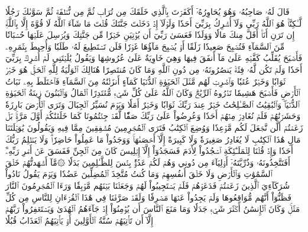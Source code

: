 قَالَ لَهُۥ صَاحِبُهُۥ وَهُوَ يُحَاوِرُهُۥٓ أَكَفَرۡتَ بِٱلَّذِي خَلَقَكَ مِن تُرَابٖ ثُمَّ مِن نُّطۡفَةٖ ثُمَّ سَوَّىٰكَ رَجُلٗا
لَّـٰكِنَّا۠ هُوَ ٱللَّهُ رَبِّي وَلَآ أُشۡرِكُ بِرَبِّيٓ أَحَدٗا
وَلَوۡلَآ إِذۡ دَخَلۡتَ جَنَّتَكَ قُلۡتَ مَا شَآءَ ٱللَّهُ لَا قُوَّةَ إِلَّا بِٱللَّهِۚ إِن تَرَنِ أَنَا۠ أَقَلَّ مِنكَ مَالٗا وَوَلَدٗا
فَعَسَىٰ رَبِّيٓ أَن يُؤۡتِيَنِ خَيۡرٗا مِّن جَنَّتِكَ وَيُرۡسِلَ عَلَيۡهَا حُسۡبَانٗا مِّنَ ٱلسَّمَآءِ فَتُصۡبِحَ صَعِيدٗا زَلَقًا
أَوۡ يُصۡبِحَ مَآؤُهَا غَوۡرٗا فَلَن تَسۡتَطِيعَ لَهُۥ طَلَبٗا
وَأُحِيطَ بِثَمَرِهِۦ فَأَصۡبَحَ يُقَلِّبُ كَفَّيۡهِ عَلَىٰ مَآ أَنفَقَ فِيهَا وَهِيَ خَاوِيَةٌ عَلَىٰ عُرُوشِهَا وَيَقُولُ يَٰلَيۡتَنِي لَمۡ أُشۡرِكۡ بِرَبِّيٓ أَحَدٗا
وَلَمۡ تَكُن لَّهُۥ فِئَةٞ يَنصُرُونَهُۥ مِن دُونِ ٱللَّهِ وَمَا كَانَ مُنتَصِرًا
هُنَالِكَ ٱلۡوَلَٰيَةُ لِلَّهِ ٱلۡحَقِّۚ هُوَ خَيۡرٞ ثَوَابٗا وَخَيۡرٌ عُقۡبٗا
وَٱضۡرِبۡ لَهُم مَّثَلَ ٱلۡحَيَوٰةِ ٱلدُّنۡيَا كَمَآءٍ أَنزَلۡنَٰهُ مِنَ ٱلسَّمَآءِ فَٱخۡتَلَطَ بِهِۦ نَبَاتُ ٱلۡأَرۡضِ فَأَصۡبَحَ هَشِيمٗا تَذۡرُوهُ ٱلرِّيَٰحُۗ وَكَانَ ٱللَّهُ عَلَىٰ كُلِّ شَيۡءٖ مُّقۡتَدِرًا
ٱلۡمَالُ وَٱلۡبَنُونَ زِينَةُ ٱلۡحَيَوٰةِ ٱلدُّنۡيَاۖ وَٱلۡبَٰقِيَٰتُ ٱلصَّـٰلِحَٰتُ خَيۡرٌ عِندَ رَبِّكَ ثَوَابٗا وَخَيۡرٌ أَمَلٗا
وَيَوۡمَ نُسَيِّرُ ٱلۡجِبَالَ وَتَرَى ٱلۡأَرۡضَ بَارِزَةٗ وَحَشَرۡنَٰهُمۡ فَلَمۡ نُغَادِرۡ مِنۡهُمۡ أَحَدٗا
وَعُرِضُواْ عَلَىٰ رَبِّكَ صَفّٗا لَّقَدۡ جِئۡتُمُونَا كَمَا خَلَقۡنَٰكُمۡ أَوَّلَ مَرَّةِۭۚ بَلۡ زَعَمۡتُمۡ أَلَّن نَّجۡعَلَ لَكُم مَّوۡعِدٗا
وَوُضِعَ ٱلۡكِتَٰبُ فَتَرَى ٱلۡمُجۡرِمِينَ مُشۡفِقِينَ مِمَّا فِيهِ وَيَقُولُونَ يَٰوَيۡلَتَنَا مَالِ هَٰذَا ٱلۡكِتَٰبِ لَا يُغَادِرُ صَغِيرَةٗ وَلَا كَبِيرَةً إِلَّآ أَحۡصَىٰهَاۚ وَوَجَدُواْ مَا عَمِلُواْ حَاضِرٗاۗ وَلَا يَظۡلِمُ رَبُّكَ أَحَدٗا
وَإِذۡ قُلۡنَا لِلۡمَلَـٰٓئِكَةِ ٱسۡجُدُواْ لِأٓدَمَ فَسَجَدُوٓاْ إِلَّآ إِبۡلِيسَ كَانَ مِنَ ٱلۡجِنِّ فَفَسَقَ عَنۡ أَمۡرِ رَبِّهِۦٓۗ أَفَتَتَّخِذُونَهُۥ وَذُرِّيَّتَهُۥٓ أَوۡلِيَآءَ مِن دُونِي وَهُمۡ لَكُمۡ عَدُوُّۢۚ بِئۡسَ لِلظَّـٰلِمِينَ بَدَلٗا
۞مَّآ أَشۡهَدتُّهُمۡ خَلۡقَ ٱلسَّمَٰوَٰتِ وَٱلۡأَرۡضِ وَلَا خَلۡقَ أَنفُسِهِمۡ وَمَا كُنتُ مُتَّخِذَ ٱلۡمُضِلِّينَ عَضُدٗا
وَيَوۡمَ يَقُولُ نَادُواْ شُرَكَآءِيَ ٱلَّذِينَ زَعَمۡتُمۡ فَدَعَوۡهُمۡ فَلَمۡ يَسۡتَجِيبُواْ لَهُمۡ وَجَعَلۡنَا بَيۡنَهُم مَّوۡبِقٗا
وَرَءَا ٱلۡمُجۡرِمُونَ ٱلنَّارَ فَظَنُّوٓاْ أَنَّهُم مُّوَاقِعُوهَا وَلَمۡ يَجِدُواْ عَنۡهَا مَصۡرِفٗا
وَلَقَدۡ صَرَّفۡنَا فِي هَٰذَا ٱلۡقُرۡءَانِ لِلنَّاسِ مِن كُلِّ مَثَلٖۚ وَكَانَ ٱلۡإِنسَٰنُ أَكۡثَرَ شَيۡءٖ جَدَلٗا
وَمَا مَنَعَ ٱلنَّاسَ أَن يُؤۡمِنُوٓاْ إِذۡ جَآءَهُمُ ٱلۡهُدَىٰ وَيَسۡتَغۡفِرُواْ رَبَّهُمۡ إِلَّآ أَن تَأۡتِيَهُمۡ سُنَّةُ ٱلۡأَوَّلِينَ أَوۡ يَأۡتِيَهُمُ ٱلۡعَذَابُ قُبُلٗا
